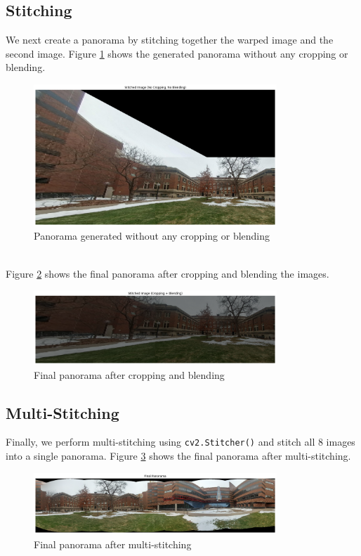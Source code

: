 \documentclass[10pt]{article}
\begin{document}
    \subsection*{\textbf{Stitching}}
    We next create a panorama by stitching together the warped image and the second
    image. Figure \ref{fig:panorama-unprocessed} shows the generated panorama without
    any cropping or blending.
    \begin{figure}[h]
        \centering
        \includegraphics[width=0.815\textwidth]{Assets/panorama-unprocessed.png}
        \caption{Panorama generated without any cropping or blending}
        \label{fig:panorama-unprocessed}
    \end{figure}
    \vspace*{0pt} \\
    Figure \ref{fig:panorama-processed} shows the final panorama after cropping and
    blending the images.
    \begin{figure}[h]
        \centering
        \includegraphics[width=0.815\textwidth]{Assets/panorama-processed.png}
        \caption{Final panorama after cropping and blending}
        \label{fig:panorama-processed}
    \end{figure}

    \subsection*{\textbf{Multi-Stitching}}
    Finally, we perform multi-stitching using \texttt{cv2.Stitcher()} and stitch all
    8 images into a single panorama. Figure \ref{fig:multi-stitching} shows the
    final panorama after multi-stitching.
    \begin{figure}[h]
        \centering
        \includegraphics[width=0.815\textwidth]{Assets/multi-stitching.png}
        \caption{Final panorama after multi-stitching}
        \label{fig:multi-stitching}
    \end{figure}
\end{document}
